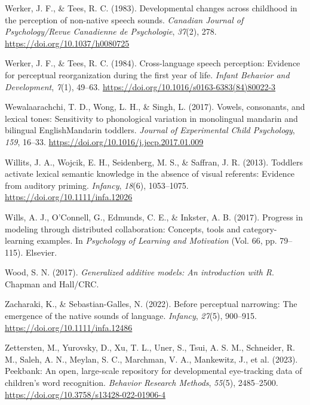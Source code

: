 \documentclass[
  12pt,
  b5paperpaper,
  twoside]{scrreprt}
\newlength{\cslhangindent}
\newlength{\cslentryspacingunit} %
\newenvironment{CSLReferences}[2] %
 {%
  \setlength{\parindent}{0pt}
  \ifodd #1
  \let\oldpar\par
  \def\par{\hangindent=\cslhangindent\oldpar}
  \fi
  \setlength{\parskip}{#2\cslentryspacingunit}
 }%
 {}
\begin{document}
\begin{CSLReferences}{1}{0}
\leavevmode{}%
Werker, J. F., \& Tees, R. C. (1983). Developmental changes across
childhood in the perception of non-native speech sounds. \emph{Canadian
Journal of Psychology/Revue Canadienne de Psychologie}, \emph{37}(2),
278. \url{https://doi.org/10.1037/h0080725}

\leavevmode{}%
Werker, J. F., \& Tees, R. C. (1984). Cross-language speech perception:
Evidence for perceptual reorganization during the first year of life.
\emph{Infant Behavior and Development}, \emph{7}(1), 49--63.
\url{https://doi.org/10.1016/s0163-6383(84)80022-3}

\leavevmode{}%
Wewalaarachchi, T. D., Wong, L. H., \& Singh, L. (2017). Vowels,
consonants, and lexical tones: Sensitivity to phonological variation in
monolingual mandarin and bilingual {English}{\textendash}{Mandarin}
toddlers. \emph{Journal of Experimental Child Psychology}, \emph{159},
16--33. \url{https://doi.org/10.1016/j.jecp.2017.01.009}

\leavevmode{}%
Willits, J. A., Wojcik, E. H., Seidenberg, M. S., \& Saffran, J. R.
(2013). Toddlers activate lexical semantic knowledge in the absence of
visual referents: Evidence from auditory priming. \emph{Infancy},
\emph{18}(6), 1053--1075. \url{https://doi.org/10.1111/infa.12026}

\leavevmode{}%
Wills, A. J., O'Connell, G., Edmunds, C. E., \& Inkster, A. B. (2017).
Progress in modeling through distributed collaboration: Concepts, tools
and category-learning examples. In \emph{Psychology of {Learning} and
{Motivation}} (Vol. 66, pp. 79--115). {Elsevier}.

\leavevmode{}%
Wood, S. N. (2017). \emph{Generalized additive models: An introduction
with {R}}. {Chapman and Hall/CRC}.

\leavevmode{}%
Zacharaki, K., \& Sebastian-Galles, N. (2022). Before perceptual
narrowing: The emergence of the native sounds of language.
\emph{Infancy}, \emph{27}(5), 900--915.
\url{https://doi.org/10.1111/infa.12486}

\leavevmode{}%
Zettersten, M., Yurovsky, D., Xu, T. L., Uner, S., Tsui, A. S. M.,
Schneider, R. M., Saleh, A. N., Meylan, S. C., Marchman, V. A.,
Mankewitz, J., et al. (2023). Peekbank: An open, large-scale repository
for developmental eye-tracking data of children's word recognition.
\emph{Behavior Research Methods}, \emph{55}(5), 2485--2500.
\url{https://doi.org/10.3758/s13428-022-01906-4}


\end{CSLReferences}
\end{document}
